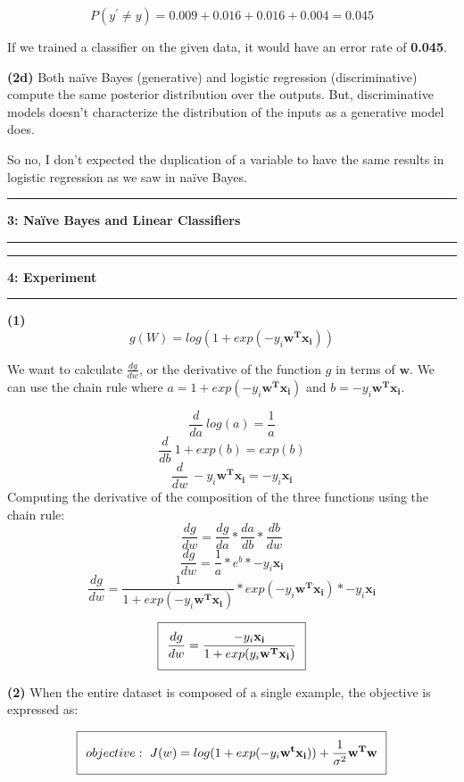 \documentclass[11pt]{article}
\newcommand\question[2]{\vspace{.25in}\hrule\textbf{#1: #2}\vspace{.5em}\hrule\vspace{.10in}}
\renewcommand\part[1]{\vspace{.10in}\textbf{(#1)}}
\begin{document}
$$P(y^\prime \neq y) = 0.009 + 0.016 + 0.016 + 0.004 = 0.045$$

If we trained a classifier on the given data, it would have an error rate of \textbf{0.045}.

\part{2d} Both na\"ive Bayes (generative) and logistic regression (discriminative) compute the same posterior distribution over the outputs. But, discriminative models doesn't characterize the distribution of the inputs as a generative model does. 

So no, I don't expected the duplication of a variable to have the same results in logistic regression as we saw in na\"ive Bayes.

\question{3}{Na\"{i}ve Bayes and Linear Classifiers}

\question{4}{Experiment}

\part{1} 
$$g(W) = log(1 + exp(-y_i\mathbf{w^Tx_i}))$$

We want to calculate $\frac{dg}{dw}$, or the derivative of the function $g$ in terms of $\mathbf{w}$. We can use the chain rule where $a = 1 + exp(-y_i\mathbf{w^Tx_i})$ and $b = -y_i\mathbf{w^Tx_i}$.

$$\frac{d}{da} \ log(a) = \frac{1}{a}$$
$$\frac{d}{db} \ 1 + exp(b)= exp(b)$$
$$\frac{d}{dw} \ -y_i\mathbf{w^Tx_i} = -y_i\mathbf{x_i}$$
Computing the derivative of the composition of the three functions using the chain rule:
$$\frac{dg}{dw} = \frac{dg}{da} * \frac{da}{db} * \frac{db}{dw}$$
$$\frac{dg}{dw} = \frac{1}{a} * e^b * -y_i\mathbf{x_i}$$
$$\frac{dg}{dw} = \frac{1}{1 + exp(-y_i\mathbf{w^Tx_i})} * exp(-y_i\mathbf{w^Tx_i}) * -y_i\mathbf{x_i}$$

\begin{equation}
\setlength\fboxsep{0.25cm}
\setlength\fboxrule{0.4pt}
\boxed{\frac{dg}{dw} = \frac{-y_i\mathbf{x_i}}{1 + exp(y_i\mathbf{w^Tx_i})}}
\end{equation} 

\part{2} When the entire dataset is composed of a single example, the objective is expressed as:

\begin{equation}
\setlength\fboxsep{0.25cm}
\setlength\fboxrule{0.4pt}
\boxed{objective:\ J(w) = log(1 + exp(-y_i\mathbf{w^tx_i})) + \frac{1}{\sigma^2}\mathbf{w^Tw}}
\end{equation}
\end{document}
